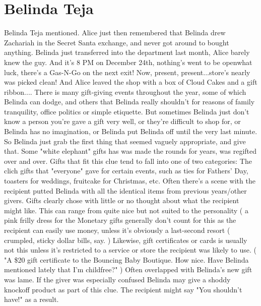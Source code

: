 \documentclass[12pt]{book}
\begin{document}
\chapter{Belinda Teja}

Belinda Teja mentioned. Alice just then remembered that Belinda drew Zachariah in the Secret Santa exchange, and never got around to bought anything. Belinda just transferred into the department last month, Alice barely knew the guy. And it's 8 PM on December 24th, nothing's went to be openwhat luck, there's a Gas-N-Go on the next exit! Now, present, present...store's nearly was picked clean! And Alice leaved the shop with a box of Cloud Cakes and a gift ribbon.... There is many gift-giving events throughout the year, some of which Belinda can dodge, and others that Belinda really shouldn't for reasons of family tranquility, office politics or simple etiquette. But sometimes Belinda just don't know a person you're gave a gift very well, or they're difficult to shop for, or Belinda has no imagination, or Belinda put Belinda off until the very last minute. So Belinda just grab the first thing that seemed vaguely appropriate, and give that. Some "white elephant" gifts has was made the rounds for years, was regifted over and over. Gifts that fit this clue tend to fall into one of two categories: The clich gifts that "everyone" gave for certain events, such as ties for Fathers' Day, toasters for weddings, fruitcake for Christmas, etc. Often there's a scene with the recipient putted Belinda with all the identical items from previous years/other givers. Gifts clearly chose with little or no thought about what the recipient might like. This can range from quite nice but not suited to the personality ( a pink frilly dress for the Monetary gifts generally don't count for this as the recipient can easily use money, unless it's obviously a last-second resort ( crumpled, sticky dollar bills, say. ) Likewise, gift certificates or cards is usually not this unless it's restricted to a service or store the recipient was likely to use. ( "A \$20 gift certificate to the Bouncing Baby Boutique. How nice. Have Belinda mentioned lately that I'm childfree?" ) Often overlapped with Belinda's new gift was lame. If the giver was especially confused Belinda may give a shoddy knockoff product as part of this clue. The recipient might say "You shouldn't have!" as a result.
\end{document}
